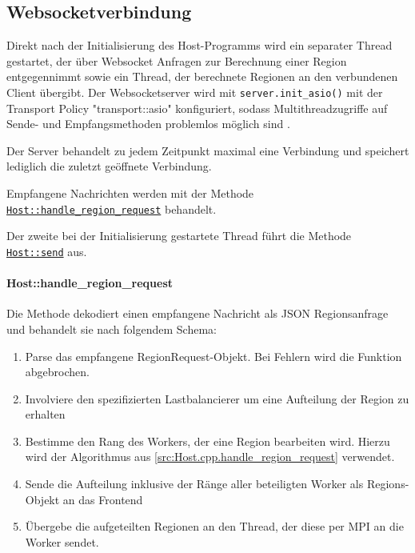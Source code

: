 \subsection{Websocketverbindung}\label{cls:Host}

Direkt nach der Initialisierung des Host-Programms wird ein separater Thread gestartet, der über Websocket
Anfragen zur Berechnung einer Region entgegennimmt sowie ein Thread, der berechnete Regionen an den verbundenen Client übergibt.
Der Websocketserver wird mit \verb|server.init_asio()| mit der Transport Policy "transport::asio"
konfiguriert, sodass Multithreadzugriffe auf Sende- und Empfangsmethoden problemlos möglich sind \cite{websocketppManual}.

Der Server behandelt zu jedem Zeitpunkt maximal eine Verbindung und speichert lediglich die zuletzt geöffnete Verbindung.

Empfangene Nachrichten werden mit der Methode \hyperref[cls:Host::handle_region_request]{\texttt{Host::handle\_region\_request}} behandelt.

Der zweite bei der Initialisierung gestartete Thread führt die Methode \hyperref[cls:Host::send]{\texttt{Host::send}} aus.

\paragraph{Host::handle\_region\_request}\label{cls:Host::handle_region_request}

Die Methode dekodiert einen empfangene Nachricht als JSON Regionsanfrage und behandelt sie nach folgendem Schema:

\begin{enumerate}
	\item Parse das empfangene RegionRequest-Objekt. Bei Fehlern wird die Funktion abgebrochen.
	\item Involviere den spezifizierten Lastbalancierer um eine Aufteilung der Region zu erhalten
	\item Bestimme den Rang des Workers, der eine Region bearbeiten wird. Hierzu wird der Algorithmus aus \autoref{src:Host.cpp.handle_region_request} verwendet.
	\item Sende die Aufteilung inklusive der Ränge aller beteiligten Worker als Regions-Objekt an das Frontend
	\item Übergebe die aufgeteilten Regionen an den Thread, der diese per MPI an die Worker sendet.
\end{enumerate}

